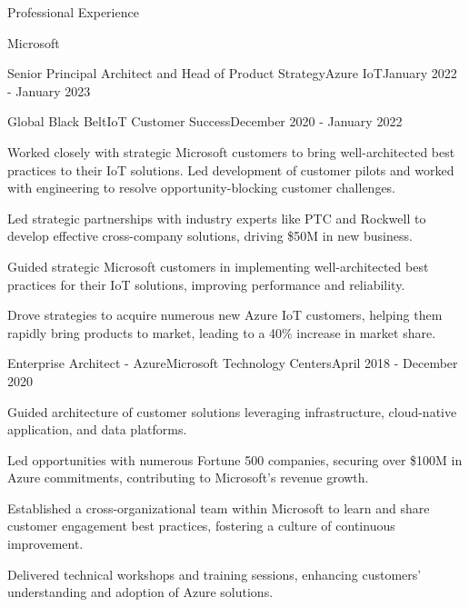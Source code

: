 \documentclass{resume} %
\begin{document}
\begin{rSection}{Professional Experience}
\begin{rCompany}{Microsoft}{}{}
\begin{rSubSubsection}{Senior Principal Architect and Head of Product Strategy}{Azure IoT}{January 2022 - January 2023}
    \end{rSubSubsection}
    
    \begin{rSubSubsection}{Global Black Belt}{IoT Customer Success}{December 2020 - January 2022}
        \item Worked closely with strategic Microsoft customers to bring well-architected best practices to their IoT solutions. Led development of customer pilots and worked with engineering to resolve opportunity-blocking customer challenges.  
        \item Led strategic partnerships with industry experts like PTC and Rockwell to develop effective cross-company solutions, driving \$50M in new business.
        \item Guided strategic Microsoft customers in implementing well-architected best practices for their IoT solutions, improving performance and reliability.
        \item Drove strategies to acquire numerous new Azure IoT customers, helping them rapidly bring products to market, leading to a 40\% increase in market share.
    \end{rSubSubsection}
    
    \begin{rSubSubsection}{Enterprise Architect - Azure}{Microsoft Technology Centers}{April 2018 - December 2020}
        \item Guided architecture of customer solutions leveraging infrastructure, cloud-native application, and data platforms.
        \item Led opportunities with numerous Fortune 500 companies, securing over \$100M in Azure commitments, contributing to Microsoft's revenue growth.
        \item Established a cross-organizational team within Microsoft to learn and share customer engagement best practices, fostering a culture of continuous improvement.
        \item Delivered technical workshops and training sessions, enhancing customers' understanding and adoption of Azure solutions.
    \end{rSubSubsection}
  \end{rCompany}


\end{rSection}
\end{document}
